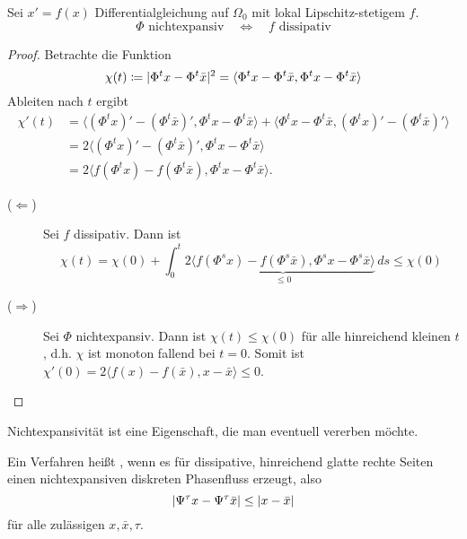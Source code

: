 \begin{lemma}
	Sei $x'=f(x)$ Differentialgleichung auf $\Omega_0$ mit lokal Lipschitz-stetigem $f$. 
	\begin{equation*}
		\Phi \text{ nichtexpansiv} \quad \Leftrightarrow \quad f \text{ dissipativ}
	\end{equation*}
\end{lemma}
\begin{proof}
	Betrachte die Funktion
	\begin{equation*}
		\chi(t) \coloneqq \lvert \Phi^tx-\Phi^t\bar{x} \rvert^2 = \langle\Phi^tx-\Phi^t\bar x, \Phi^tx-\Phi^t\bar x\rangle
	\end{equation*}
	Ableiten nach $t$ ergibt
	\begin{align*}
		\chi'(t) &= \langle(\Phi^tx)'-(\Phi^t\bar x)', \Phi^tx-\Phi^t\bar x\rangle + \langle\Phi^tx-\Phi^t\bar x, (\Phi^tx)'-(\Phi^t\bar x)'\rangle \\
     &=  2\langle(\Phi^tx)'-(\Phi^t\bar x)', \Phi^tx-\Phi^t\bar x\rangle \\
     &=  2\langle f(\Phi^tx)-f(\Phi^t\bar x), \Phi^tx-\Phi^t\bar x\rangle.
	\end{align*}
	\begin{description}
		\item[($\boldsymbol{\Leftarrow}$)] Sei $f$ dissipativ. Dann ist
		\begin{equation*}
			\chi(t) = \chi(0) + \int_0^t 2\underbrace{\langle f(\Phi^sx)-f(\Phi^s\bar x), \Phi^sx-\Phi^s\bar x\rangle}_{\leq 0}\,ds
			\leq \chi(0)
		\end{equation*}
		\item[($\boldsymbol{\Rightarrow}$)] Sei $\Phi$ nichtexpansiv. Dann ist $\chi(t)\leq \chi(0)$ für alle hinreichend kleinen $t$, d.h. $\chi$ ist monoton fallend bei $t=0$. Somit ist $\chi'(0) = 2\langle f(x)-f(\bar x), x-\bar x\rangle \leq 0$.
	\end{description}
\end{proof}
%
Nichtexpansivität ist eine Eigenschaft, die man eventuell vererben möchte.

\begin{definition}[Butcher 1975]
	Ein Verfahren heißt , wenn es für dissipative, hinreichend glatte rechte Seiten einen nichtexpansiven diskreten Phasenfluss erzeugt, also
	\begin{equation*}
		\lvert \Psi^\tau x-\Psi^\tau \bar x \rvert \leq \lvert x-\bar x \rvert
	\end{equation*}
	für alle zulässigen $x,\bar x,\tau$.
\end{definition}

